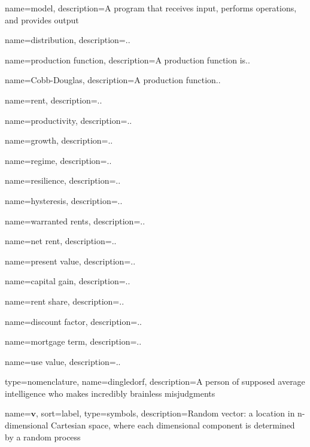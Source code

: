{
name=model,
description={A program that receives input, performs operations, 
						and provides output}
}

{
name=distribution,
description={..}
}

{
name=production function,
description={A production function is..}
}

{
name=Cobb-Douglas,
description={A production function..}
}

{
name=rent,
description={..}
}

{
name=productivity,
description={..}
}

{
name=growth,
description={..}
}

{
name=regime,
description={..}
}

{
name=resilience,
description={..}
}

{
name=hysteresis,
description={..}
}

{
name=warranted rents,
description={..}
}

{
name=net rent,
description={..}
}

{
name=present value,
description={..}
}

{
name=capital gain,
description={..}
}

{
name=rent share,
description={..}
}

{
name=discount factor,
description={..}
}

{
name=mortgage term,
description={..}
}

{
name=use value,
description={..}
}


{
type=nomenclature,
name=dingledorf,
description={A person of supposed average intelligence who makes incredibly brainless misjudgments}
}



{
name={$\mathbf{v}$},
sort={label},
type=symbols,
description={Random vector: a location in n-dimensional Cartesian space, where each dimensional component is determined by a random process}
}